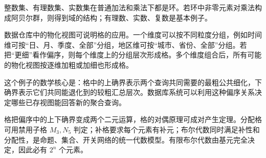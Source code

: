整数集、有理数集、实数集在普通加法和乘法下都是环。若环中非零元素对乘法构成阿贝尔群，则得到域的结构；有理数、实数、复数是基本例子。

\begin{example}[title={应用阅读：视图格与数据仓库查询}]\label{view-lattice-reading}
  数据仓库中的物化视图可说明格的应用。一个维度可以按不同粒度分组，例如时间维可按“日、月、季度、全部”分组，地区维可按“城市、省份、全部”分组。若把“更细”看作偏序，则每个维度上的分组层次形成格。多个维度组合后，所有可能的物化视图按逐维加粗或加细也形成格。

  这个例子的数学核心是：格中的上确界表示两个查询共同需要的最粗公共细化，下确界表示它们共同能退化到的较粗汇总层次。数据库系统可以利用这种偏序关系决定哪些已存视图能回答新的聚合查询。
\end{example}

\begin{summary}[本节提要]
  格把偏序中的上下确界变成两个二元运算，格的对偶原理可成对产生定理。分配格可用禁用子格 $M_3,N_5$ 判定；补格要求每个元素有补元；布尔代数同时满足补性和分配性，是命题、集合、开关网络的统一代数模型。有限布尔代数由基元完全决定，因此必有 $2^n$ 个元素。
\end{summary}
